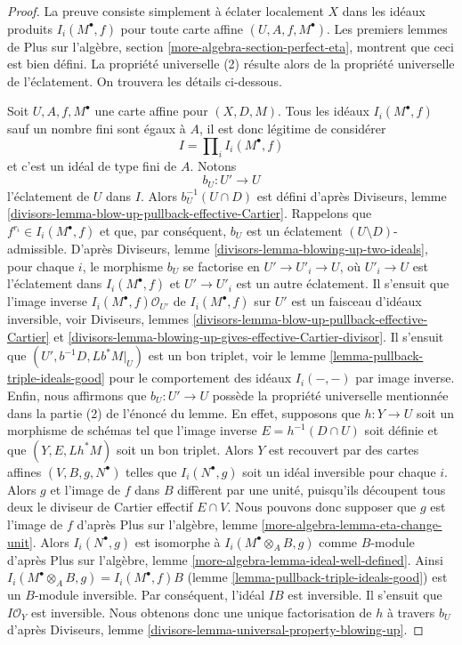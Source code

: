 \begin{proof}
La preuve consiste simplement à éclater localement $X$ dans les idéaux produits
$I_i(M^\bullet, f)$ pour toute carte affine $(U, A, f, M^\bullet)$.
Les premiers lemmes de Plus sur l'algèbre, section
\ref{more-algebra-section-perfect-eta}, montrent que ceci est bien défini.
La propriété universelle (2) résulte alors de la
propriété universelle de l'éclatement.
On trouvera les détails ci-dessous.

\medskip\noindent
Soit $U, A, f, M^\bullet$ une carte affine pour $(X, D, M)$.
Tous les idéaux $I_i(M^\bullet, f)$ sauf un nombre fini sont
égaux à $A$, il est donc légitime de considérer
$$
I = \prod\nolimits_i I_i(M^\bullet, f)
$$
et c'est un idéal de type fini de $A$. Notons
$$
b_U : U' \to U
$$
l'éclatement de $U$ dans $I$. Alors $b_U^{-1}(U \cap D)$ est défini d'après
Diviseurs, lemme
\ref{divisors-lemma-blow-up-pullback-effective-Cartier}.
Rappelons que $f^{r_i} \in I_i(M^\bullet, f)$ et que, par conséquent,
$b_U$ est un éclatement $(U \setminus D)$-admissible.
D'après Diviseurs, lemme \ref{divisors-lemma-blowing-up-two-ideals},
pour chaque $i$, le morphisme $b_U$ se factorise en $U' \to U'_i \to U$,
où $U'_i \to U$ est l'éclatement dans $I_i(M^\bullet, f)$
et $U' \to U'_i$ est un autre éclatement. Il s'ensuit que
l'image inverse $I_i(M^\bullet, f)\mathcal{O}_{U'}$
de $I_i(M^\bullet, f)$ sur $U'$ est un faisceau d'idéaux inversible, voir
Diviseurs, lemmes \ref{divisors-lemma-blow-up-pullback-effective-Cartier} et
\ref{divisors-lemma-blowing-up-gives-effective-Cartier-divisor}.
Il s'ensuit que $(U', b^{-1}D, Lb^*M|_U)$ est un bon triplet, voir
le lemme \ref{lemma-pullback-triple-ideals-good}
pour le comportement des idéaux $I_i(-,-)$ par image inverse.
Enfin, nous affirmons que $b_U : U' \to U$ possède la propriété universelle
mentionnée dans la partie (2) de l'énoncé du lemme. En effet, supposons que
$h : Y \to U$ soit un morphisme de schémas tel que
l'image inverse $E = h^{-1}(D \cap U)$ soit définie et que $(Y, E, Lh^*M)$
soit un bon triplet. Alors $Y$ est recouvert par des cartes affines
$(V, B, g, N^\bullet)$ telles que $I_i(N^\bullet, g)$ soit
un idéal inversible pour chaque $i$. Alors $g$ et l'image de
$f$ dans $B$ diffèrent par une unité, puisqu'ils découpent tous deux le diviseur de Cartier
effectif $E \cap V$. Nous pouvons donc supposer que $g$ est l'image de $f$ d'après
Plus sur l'algèbre, lemme \ref{more-algebra-lemma-eta-change-unit}.
Alors $I_i(N^\bullet, g)$ est isomorphe à $I_i(M^\bullet \otimes_A B, g)$
comme $B$-module d'après Plus sur l'algèbre, lemme
\ref{more-algebra-lemma-ideal-well-defined}.
Ainsi $I_i(M^\bullet \otimes_A B, g) = I_i(M^\bullet, f)B$
(lemme \ref{lemma-pullback-triple-ideals-good})
est un $B$-module inversible.
Par conséquent, l'idéal $IB$ est inversible. Il s'ensuit que $I\mathcal{O}_Y$
est inversible. Nous obtenons donc une unique factorisation de $h$ à travers
$b_U$ d'après Diviseurs, lemme \ref{divisors-lemma-universal-property-blowing-up}.


\end{proof}
